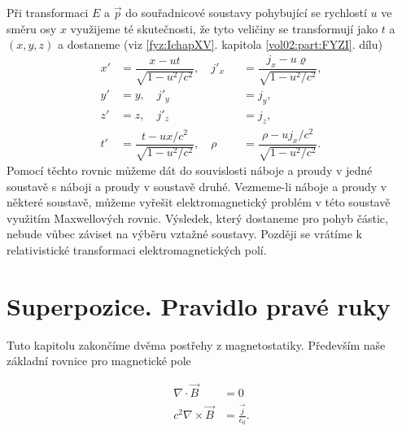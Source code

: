     Při transformaci \(E\) a \(\vec{p}\) do souřadnicové soustavy pohybující se rychlostí \(u\) ve
    směru osy \(x\) využijeme té skutečnosti, že tyto veličiny se transformují jako \(t\) a \((x, y,
    z)\) a dostaneme (viz \ref{fyz:IchapXV}. kapitola \ref{vol02:part:FYZI}. dílu)
    \begin{subequations}\label{fyz:eq824}
      \begin{alignat}{2}
        x'&=\dfrac{x -ut}{\sqrt{1−u^2/c^2}},\hspace{1em} 
        j'_x&&=\dfrac{j_x-u\varrho}{\sqrt{1−u^2/c^2}},               \label{fyz:eq824a}  \\
        y'&=y,\hspace{1em}   j'_y&&=j_y,                              \label{fyz:eq824b}  \\
        z'&=z,\hspace{1em}   j'_z&&=j_z,                              \label{fyz:eq824c}  \\
        t'&=\dfrac{t -ux/c^2}{\sqrt{1−u^2/c^2}},\hspace{1em}     
        ρ&&=\dfrac{ρ-uj_x/c^2}{\sqrt{1−u^2/c^2}}.                    \label{fyz:eq824d}    
      \end{alignat}
    \end{subequations}
    Pomocí těchto rovnic můžeme dát do souvislosti náboje a proudy v jedné soustavě s náboji a
    proudy v soustavě druhé. Vezmeme-li náboje a proudy v některé soustavě, můžeme vyřešit
    elektromagnetický problém v této soustavě využitím Maxwellových rovnic. Výsledek, který
    dostaneme pro pohyb částic, nebude vůbec záviset na výběru vztažné soustavy. Později se vrátíme
    k relativistické transformaci elektromagnetických polí.

  \section{Superpozice. Pravidlo pravé ruky}\label{fyz:IIchapXIIIsecVIII}
    Tuto kapitolu zakončíme dvěma postřehy z magnetostatiky. Především naše základní rovnice pro
    magnetické pole

      \begin{align*}
        \nabla\cdot\vec{B}     &= 0                             \\
        c^2\nabla\times\vec{B} &= \frac{\vec{j}}{\epsilon_0}.  
      \end{align*}

